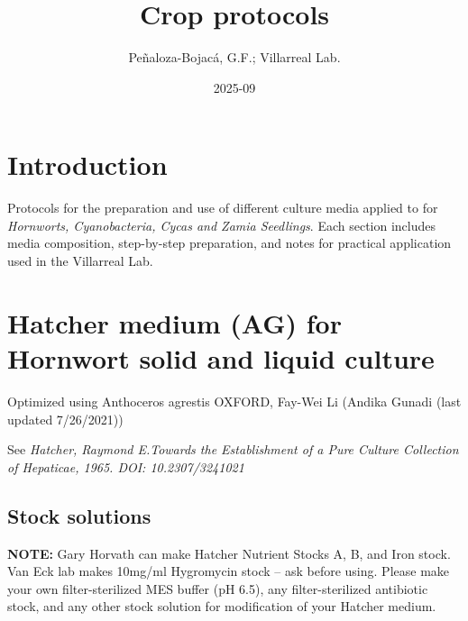 \documentclass[
  11pt,
]{article}
\title{Crop protocols}
\author{Peñaloza-Bojacá, G.F.; Villarreal Lab.}
\date{2025-09}
\begin{document}
\maketitle

{
\setcounter{tocdepth}{3}
\tableofcontents
}
\section{Introduction}\label{introduction}

Protocols for the preparation and use of different culture media applied
to for \emph{Hornworts, Cyanobacteria, Cycas and Zamia Seedlings}. Each
section includes media composition, step-by-step preparation, and notes
for practical application used in the Villarreal Lab.

\section{Hatcher medium (AG) for Hornwort solid and liquid
culture}\label{hatcher-medium-ag-for-hornwort-solid-and-liquid-culture}

Optimized using Anthoceros agrestis OXFORD, Fay-Wei Li (Andika Gunadi
(last updated 7/26/2021))

See \emph{Hatcher, Raymond E.Towards the Establishment of a Pure Culture
Collection of Hepaticae, 1965. DOI: 10.2307/3241021}

\subsection{Stock solutions}\label{stock-solutions}

\textbf{NOTE:} Gary Horvath can make Hatcher Nutrient Stocks A, B, and
Iron stock. Van Eck lab makes 10mg/ml Hygromycin stock -- ask before
using. Please make your own filter-sterilized MES buffer (pH 6.5), any
filter-sterilized antibiotic stock, and any other stock solution for
modification of your Hatcher medium.
\end{document}
